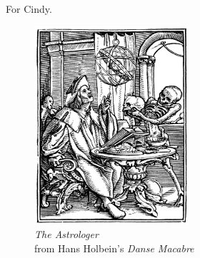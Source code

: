 
For Cindy.

\begin{figure}
    \vspace{50pt}
    \centering
    \includegraphics[width=0.51\textwidth]{frontmatter/holbein-astrologer.jpg}
    \\
    \emph{The Astrologer}
    \\
    from Hans Holbein's \emph{Danse Macabre}
\end{figure}